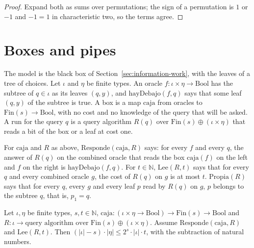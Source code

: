 \begin{proof}
  \leanok
  Expand both as sums over permutations; the sign of a permutation is $1$ or $-1$ and $-1 = 1$ in
  characteristic two, so the terms agree.
\end{proof}

\section{Boxes and pipes}
\label{sec:information-box}

The model is the black box of Section~\ref{sec:information-work}, with the leaves of a tree of
choices. Let $\iota$ and $\eta$ be finite types. An oracle $f : \iota \times \eta \to \mathrm{Bool}$
has the subtree of $q \in \iota$ as its leaves $(q, y)$, and $\mathrm{hayDebajo}(f, q)$ says
that some leaf $(q, y)$ of the subtree is true. A box is a map $\mathrm{caja}$ from oracles to
$\mathrm{Fin}(s) \to \mathrm{Bool}$, with no cost and no knowledge of the query that will be asked.
A run for the query $q$ is a query algorithm $R(q)$ over $\mathrm{Fin}(s) \oplus (\iota \times
\eta)$ that reads a bit of the box or a leaf at cost one.

\begin{definition}
  \label{def:information-box-run}
  \leanok
  For $\mathrm{caja}$ and $R$ as above, $\mathrm{Responde}(\mathrm{caja}, R)$ says: for every $f$ and
  every $q$, the answer of $R(q)$ on the combined oracle that reads the box
  $\mathrm{caja}(f)$ on the left and $f$ on the right is $\mathrm{hayDebajo}(f, q)$. For
  $t \in \mathbb{N}$, $\mathrm{Lee}(R, t)$ says that for every $q$ and every combined oracle $g$, the
  cost of $R(q)$ on $g$ is at most $t$. $\mathrm{Propia}(R)$ says that for every $q$, every $g$ and
  every leaf $p$ read by $R(q)$ on $g$, $p$ belongs to the subtree $q$, that is, $p_1 = q$.
  \own{}
\end{definition}

\begin{theorem}
  \label{thm:information-static-box}
  \leanok
  Let $\iota, \eta$ be finite types, $s, t \in \mathbb{N}$, $\mathrm{caja} : (\iota \times \eta \to
  \mathrm{Bool}) \to \mathrm{Fin}(s) \to \mathrm{Bool}$ and $R : \iota \to \text{query
  algorithm over } \mathrm{Fin}(s) \oplus (\iota \times \eta)$. Assume $\mathrm{Responde}(\mathrm{caja},
  R)$ and $\mathrm{Lee}(R, t)$. Then $(|\iota| - s) \cdot |\eta| \le 2^s \cdot |\iota| \cdot t$,
  with the subtraction of natural numbers.
  \own{}
\end{theorem}

